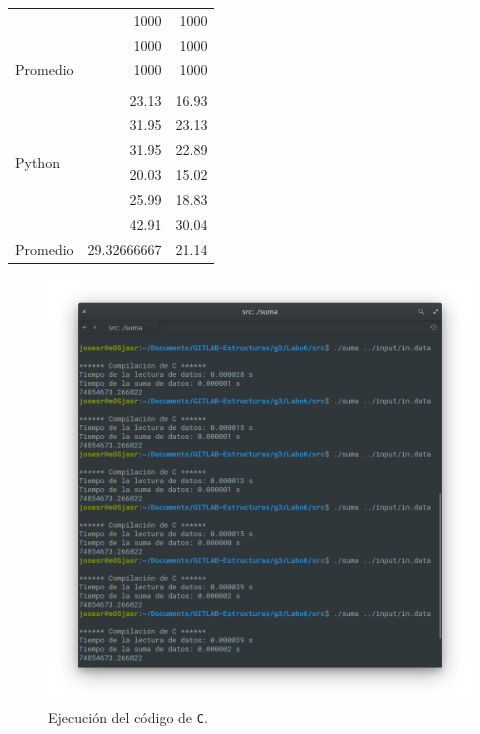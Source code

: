 \begin{table}[]
\begin{tabular}{lrr}
                        & 1000                  & 1000              \\
                        & 1000                  & 1000              \\
Promedio                & 1000                  & 1000              \\
                        &                       &                   \\
\multirow{6}{*}{Python} & 23.13                 & 16.93             \\
                        & 31.95                 & 23.13             \\
                        & 31.95                 & 22.89             \\
                        & 20.03                 & 15.02             \\
                        & 25.99                 & 18.83             \\
                        & 42.91                 & 30.04             \\
Promedio                & 29.32666667           & 21.14            
\end{tabular}
\end{table}

\begin{figure}[H]
\centering
\includegraphics[width=\textwidth]{imgs/Labo6/resC.png}
\caption{Ejecución del código de \texttt{C}.}
\label{fig:C}
\end{figure}

